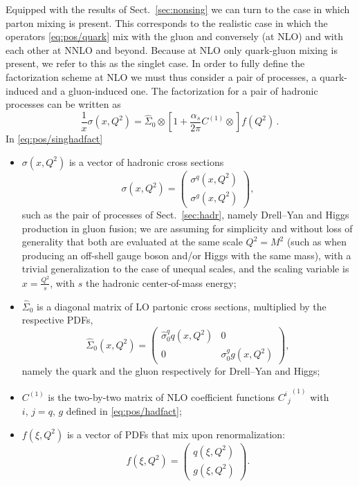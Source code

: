 Equipped with the results of Sect.~\ref{sec:nonsing} we can  turn to
the case in which parton mixing is present.   This corresponds to the
realistic case in which the operators \cref{eq:pos/quark} mix with
the gluon and conversely (at NLO) and with each other at NNLO and
beyond. Because at NLO only quark-gluon mixing is present, we refer to
this as the singlet case.
In order to fully define
the factorization scheme at NLO we must thus consider a pair of
processes, a quark-induced and a gluon-induced one.
The factorization for a pair of hadronic processes
can be written as 
\begin{equation}\label{eq:pos/singhadfact}
 \frac{1}{x} \sigma(x,Q^2)= \hat \Sigma_0\otimes \left[1
 +\frac{\alpha_s}{2\pi}  C^{(1)} \otimes \right] f(Q^2) \,.
 \end{equation}
In \cref{eq:pos/singhadfact} \begin{itemize}
  \item $\sigma(x,Q^2)$ is a vector of hadronic cross sections
\begin{equation}\label{eq:pos/hadxsec}
   \sigma(x,Q^2)=\left(\begin{array}{c} \sigma^{q}(x,Q^2)\\ \sigma^{g} (x,Q^2)\end{array}\right),
\end{equation}
 such as
the pair of processes of Sect.~\ref{sec:hadr}, namely Drell--Yan  and
Higgs production in gluon fusion; we are assuming for simplicity  and without loss of
generality that both are evaluated at the same scale $Q^2=M^2$ (such
as when producing an off-shell gauge boson and/or Higgs with the same
mass), with a trivial generalization to the case of unequal scales,
and the scaling variable is $x=\frac{Q^2}{s}$, with $s$ the hadronic
center-of-mass energy;
\item $\hat \Sigma_0$ is a diagonal matrix of LO partonic cross sections,
  multiplied by the respective PDFs, 
\begin{equation}\label{eq:pos/lohadxsec}
   \hat \Sigma_0(x,Q^2)=\left(\begin{array}{cc} \hat \sigma_0^{q} q (x,Q^2) &
   0 \\0 & \sigma_0^{g} g (x,Q^2) \end{array}\right),
\end{equation}
namely the quark and the gluon respectively for Drell--Yan and Higgs;
\item $C^{(1)}$ is the two-by-two matrix of NLO 
  coefficient functions ${C^i{}_{j}}^{(1)}$ with $i,\, j=q,\, g$
  defined in \cref{eq:pos/hadfact};
\item $f(\xi,Q^2)$ is a vector of PDFs that mix upon renormalization:
\begin{equation}\label{eq:pos/singpdf}
   f(\xi,Q^2)=\left(\begin{array}{c} q(\xi,Q^2) \\ g(\xi,Q^2) \end{array}\right).
\end{equation}
\end{itemize}

